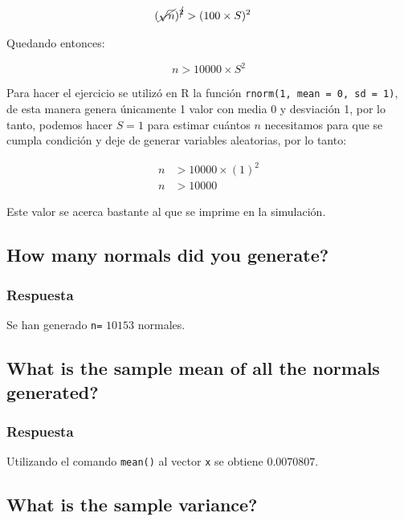 \documentclass[12pt]{article}\usepackage[]{graphicx}\usepackage[]{xcolor}
\begin{document}
\begin{align*}
  (\cancel{\sqrt{n}})^{\cancel{2}} &> (100 \times S)^{2} 
\end{align*}

Quedando entonces:

\[
n > 10000\times S^{2}
\]

Para hacer el ejercicio se utilizó en \textsf{R} la función \texttt{rnorm(1, mean = 0, sd = 1)}, de esta manera genera únicamente 1 valor con media 0 y desviación 1, por lo tanto, podemos hacer $S = 1$ para estimar cuántos $n$ necesitamos para que se cumpla condición y deje de generar variables aleatorias, por lo tanto:

\begin{align*}
  n &> 10000 \times (1)^{2} \\
  n &> 10000 
\end{align*}

Este valor se acerca bastante al que se imprime en la simulación. 











\subsection{How many normals did you generate?}
\label{subsec:p1-b}

\subsubsection{Respuesta}

Se han generado \lstinline|n=| $10153$ normales.


\subsection{What is the sample mean of all the normals generated?}
\label{subsec:p1-c}




\subsubsection{Respuesta}

Utilizando el comando \lstinline|mean()| al vector \lstinline|x| se obtiene $0.0070807$. 

\subsection{What is the sample variance?}
\label{subsec:p1-d}
\end{document}
